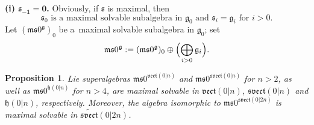 \documentclass[10pt,a4paper]{amsart}
\newcommand {\fg} {{\mathfrak{g}}} %
\newcommand {\fh} {{\mathfrak{h}}}
\newcommand {\fm} {{\mathfrak{m}}}
\newcommand {\fs} {{\mathfrak{s}}}
\newcommand {\fsvect} {{\mathfrak{svect}}}
\newcommand {\fvect} {{\mathfrak{vect}}} %
\newcommand {\<} [2] {{\left.\vphantom{#2}\right.^{#1\!}\!{#2}}}
\numberwithin{equation}{section}
\newtheorem{Proposition}[Theorem]{Proposition}
\begin{document}
{\bf (i) $\boldsymbol{\fs_{-1}=0}$.} Obviously, if $\fs$ is maximal, then
\[
\text{$\fs_0$ is a~maximal solvable subalgebra in $\fg_0$ and $\fs_i=\fg_i$ for $i>0$}.
\]
Let $(\fm\fs0^{\fg})_0$ be a~maximal solvable
subalgebra in $\fg_0$; set
\begin{gather}\label{ms}
\fm\fs0^{\fg}:= (\fm\fs0^{\fg})_0\oplus\Bigl(\bigoplus_{i>0} \fg_i\Bigr).
\end{gather}


\begin{Proposition}\label{P1} Lie superalgebras $\fm\fs0^{\fvect(0|n)}$ and $\fm\fs0^{\fsvect(0|n)}$ for $n>2$, as well as $\fm\fs0^{\fh(0|n)}$ for $n>4$, are maximal solvable in $\fvect(0|n)$, $\fsvect(0|n)$ and $\fh(0|n)$, respectively. Moreover, the algebra isomorphic to $\fm\fs0^{\fsvect(0|2n)}$ is maximal solvable in $\widetilde{\fsvect}(0|2n)$.
\end{Proposition}
\end{document}
